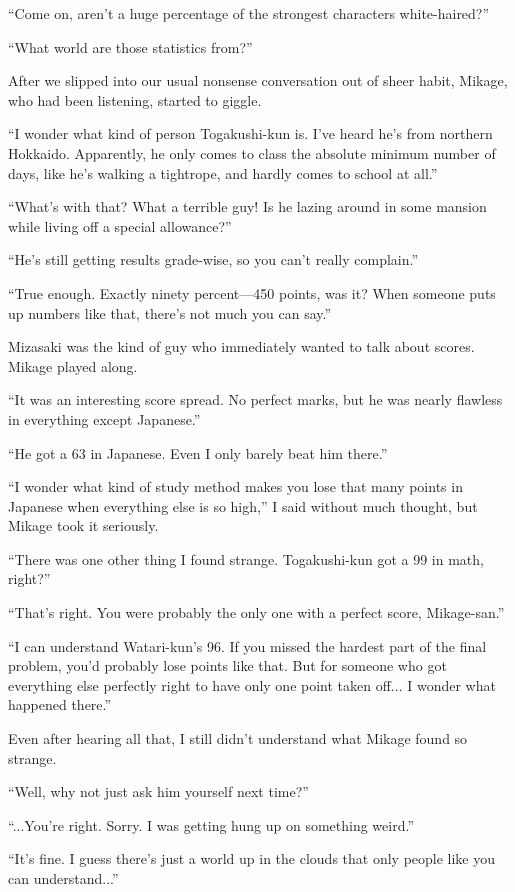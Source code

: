 \documentclass[
    a4paper,
    12pt,
    twoside,
    openany,
    UTF8,
    fontset=windows
]{ctexbook}
\begin{document}
``Come on, aren't a huge percentage of the strongest characters white-haired?''

``What world are those statistics from?''

After we slipped into our usual nonsense conversation out of sheer habit, Mikage, who had been listening, started to giggle.

``I wonder what kind of person Togakushi-kun is. I've heard he's from northern Hokkaido. Apparently, he only comes to class the absolute minimum number of days, like he's walking a tightrope, and hardly comes to school at all.''

``What's with that? What a terrible guy! Is he lazing around in some mansion while living off a special allowance?''

``He's still getting results grade-wise, so you can't really complain.''

``True enough. Exactly ninety percent---450 points, was it? When someone puts up numbers like that, there's not much you can say.''

Mizasaki was the kind of guy who immediately wanted to talk about scores. Mikage played along.

``It was an interesting score spread. No perfect marks, but he was nearly flawless in everything except Japanese.''

``He got a 63 in Japanese. Even I only barely beat him there.''

``I wonder what kind of study method makes you lose that many points in Japanese when everything else is so high,'' I said without much thought, but Mikage took it seriously.

``There was one other thing I found strange. Togakushi-kun got a 99 in math, right?''

``That's right. You were probably the only one with a perfect score, Mikage-san.''

``I can understand Watari-kun's 96. If you missed the hardest part of the final problem, you'd probably lose points like that. But for someone who got everything else perfectly right to have only one point taken off... I wonder what happened there.''

Even after hearing all that, I still didn't understand what Mikage found so strange.

``Well, why not just ask him yourself next time?''

``...You're right. Sorry. I was getting hung up on something weird.''

``It's fine. I guess there's just a world up in the clouds that only people like you can understand...''
\end{document}
